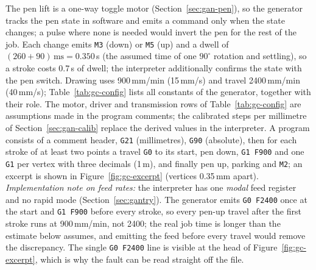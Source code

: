 The pen lift is a one-way toggle motor (Section~\ref{sec:gan-pen}), so the generator tracks the pen state in software and emits a command only when the state changes; a pulse where none is needed would invert the pen for the rest of the job.
Each change emits \texttt{M3} (down) or \texttt{M5} (up) and a dwell of $(260+90)\,\mathrm{ms}=0.350$\,s (the assumed time of one $90^\circ$ rotation and settling), so a stroke costs 0.7\,s of dwell; the interpreter additionally confirms the state with the pen switch.
Drawing uses 900\,mm/min (15\,mm/s) and travel 2400\,mm/min (40\,mm/s); Table~\ref{tab:gc-config} lists all constants of the generator, together with their role.
The motor, driver and transmission rows of Table~\ref{tab:gc-config} are assumptions made in the program comments; the calibrated steps per millimetre of Section~\ref{sec:gan-calib} replace the derived values in the interpreter.
A program consists of a comment header, \texttt{G21} (millimetres), \texttt{G90} (absolute), then for each stroke of at least two points a travel \texttt{G0} to its start, pen down, \texttt{G1 F900} and one \texttt{G1} per vertex with three decimals (1\,\textmu m), and finally pen up, parking and \texttt{M2}; an excerpt is shown in Figure~\ref{fig:gc-excerpt} (vertices 0.35\,mm apart).
\emph{Implementation note on feed rates:} the interpreter has one \emph{modal} feed register and no rapid mode (Section~\ref{sec:gantry}).
The generator emits \texttt{G0 F2400} once at the start and \texttt{G1 F900} before every stroke, so every pen-up travel after the first stroke runs at 900\,mm/min, not 2400; the real job time is longer than the estimate below assumes, and emitting the feed before every travel would remove the discrepancy.
The single \texttt{G0 F2400} line is visible at the head of Figure~\ref{fig:gc-excerpt}, which is why the fault can be read straight off the file.


